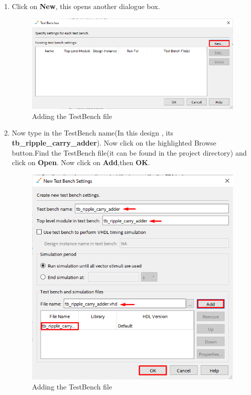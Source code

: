 \documentclass[12pt,singleside,a4paper]{article}
\begin{document}
\begin{enumerate}
    \item Click on \textbf{New}, this opens another dialogue box.
    \begin{figure}[H]
        \centering
    \includegraphics[width=14cm,keepaspectratio]{img25.png}
    \caption{Adding the TestBench file}
    \end{figure}
    \newpage
    \item Now type in the TestBench name(In this design , its \textbf{tb\_ripple\_carry\_adder}). Now click on the highlighted Browse button.Find the TestBench file(it can be found in the project directory) and click on \textbf{Open}. Now click on \textbf{Add},then \textbf{OK}.
            \begin{figure}[H]
        \centering
    \includegraphics[scale=0.73]{img26.png}
    \caption{Adding the TestBench file}
    \end{figure}
    
 \end{enumerate}
\end{document}
